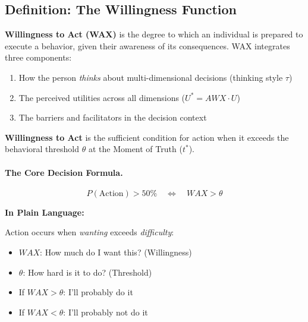 \subsection{Definition: The Willingness Function}
\label{subsec:12-1-definition}

\begin{definition}
\label{def:willingness-content}
\textbf{Willingness to Act (WAX)} is the degree to which an individual is 
prepared to execute a behavior, given their awareness of its consequences. 
WAX integrates three components:
\begin{enumerate}
\item How the person \textit{thinks} about multi-dimensional decisions (thinking style $\tau$)
\item The perceived utilities across all dimensions ($U^* = AWX \cdot U$)
\item The barriers and facilitators in the decision context
\end{enumerate}
\end{definition}

\begin{definition}
\label{def:willingness-function}
\textbf{Willingness to Act} is the sufficient condition for action when 
it exceeds the behavioral threshold $\theta$ at the Moment of Truth ($t^*$).
\end{definition}

\paragraph{The Core Decision Formula.}
\begin{equation}
\boxed{P(\text{Action}) > 50\% \quad \Leftrightarrow \quad WAX > \theta}
\label{eq:willingness-threshold}
\end{equation}

\begin{intuition}
\textbf{In Plain Language:}

Action occurs when \textit{wanting} exceeds \textit{difficulty}:
\begin{itemize}
\item $WAX$: How much do I want this? (Willingness)
\item $\theta$: How hard is it to do? (Threshold)
\item If $WAX > \theta$: I'll probably do it
\item If $WAX < \theta$: I'll probably not do it
\end{itemize}
\end{intuition}

